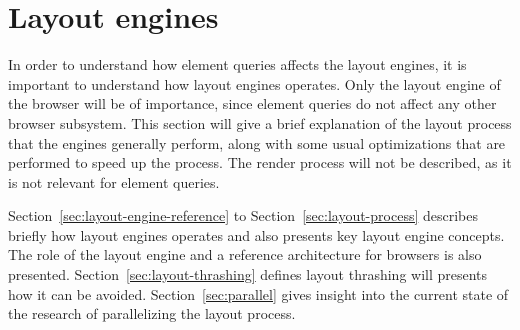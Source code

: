 \documentclass[a4paper,11pt]{kth-mag}
\begin{document}
    \section{Layout engines}\label{sec:layout-engines}
      In order to understand how element queries affects the \glspl{layout engine}, it is important to understand how \glspl{layout engine} operates.
      Only the \gls{layout engine} of the \gls{browser} will be of importance, since element queries do not affect any other \gls{browser} subsystem.
      This section will give a brief explanation of the layout process that the engines generally perform, along with some usual optimizations that are performed to speed up the process.
      The render process will not be described, as it is not relevant for element queries.

      Section~\ref{sec:layout-engine-reference} to Section~\ref{sec:layout-process} describes briefly how layout engines operates and also presents key layout engine concepts.
      The role of the layout engine and a reference architecture for browsers is also presented.
      Section~\ref{sec:layout-thrashing} defines layout thrashing will presents how it can be avoided.
      Section~\ref{sec:parallel} gives insight into the current state of the research of parallelizing the layout process.

      
\end{document}
